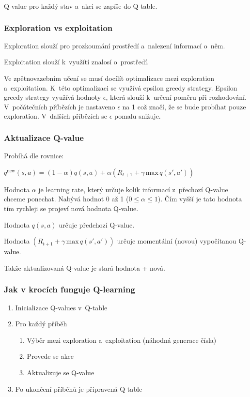 Q-value pro každý stav a~akci se zapíše do Q-table. 

\subsubsection{Exploration vs exploitation}

Exploration slouží pro prozkoumání prostředí a~nalezení informací o~něm.

Exploitation slouží k~využítí znalosí o~prostředí.

Ve zpětnovazebním učení se musí docílít optimalizace mezi exploration a~exploitation.
K~této optimalizaci se využívá epsilon greedy strategy.
Epsilon greedy strategy využívá hodnoty $\epsilon$, která slouží k~určení poměru při rozhodování.
V~počátečních příbězích je nastaveno $\epsilon$ na 1 což značí, že se bude probíhat pouze exploration. 
V~dalších příbězích se $\epsilon$ pomalu snižuje.

\subsubsection{Aktualizace Q-value}

Probíhá dle rovnice:

$q^\text{new}(s,a) = (1-\alpha)q(s,a) + \alpha \left(R_{t+1} + \gamma\,\text{max}\,q(s',a')\right)$

Hodnota $\alpha$ je learning rate, který určuje kolik informací z~přechozí Q-value chceme ponechat.
Nabývá hodnot 0 až 1 ($0\leq\alpha\leq1$).
Čím vyšší je tato hodnota tím rychleji se projeví nová hodnota Q-value. 

Hodnota $q(s,a)$ určuje předchozí Q-value.

Hodnota $\left(R_{t+1} + \gamma\,\text{max}\,q(s',a')\right)$ určuje momentální (novou) vypočítanou Q-value.

Takže aktualizovaná Q-value je stará hodnota + nová.


\subsubsection{Jak v krocích funguje Q-learning}

\begin{enumerate}
    \item Inicializace Q-values v~Q-table
    \item Pro každý příběh
    \begin{enumerate}
    	\item Výběr mezi exploration a~exploitation (náhodná generace čísla)
    	\item Provede se akce
    	\item Aktualizuje se Q-value 
    \end{enumerate}
    \item Po ukončení příběhů je připravená Q-table
\end{enumerate}

